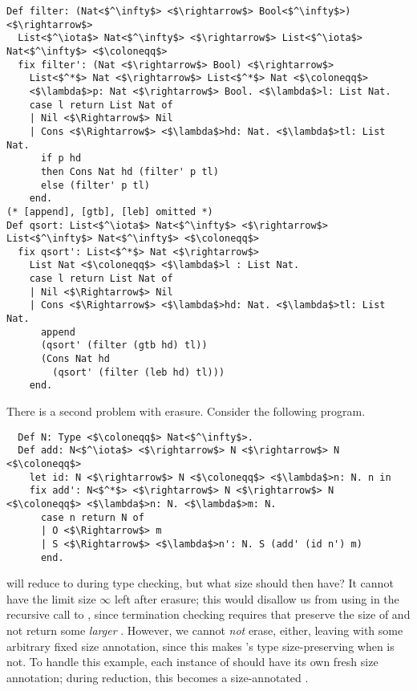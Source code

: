 \begin{multicols}{2}
\begin{verbatim}
Def filter: (Nat<$^\infty$> <$\rightarrow$> Bool<$^\infty$>) <$\rightarrow$>
  List<$^\iota$> Nat<$^\infty$> <$\rightarrow$> List<$^\iota$> Nat<$^\infty$> <$\coloneqq$>
  fix filter': (Nat <$\rightarrow$> Bool) <$\rightarrow$>
    List<$^*$> Nat <$\rightarrow$> List<$^*$> Nat <$\coloneqq$>
    <$\lambda$>p: Nat <$\rightarrow$> Bool. <$\lambda$>l: List Nat.
    case l return List Nat of
    | Nil <$\Rightarrow$> Nil
    | Cons <$\Rightarrow$> <$\lambda$>hd: Nat. <$\lambda$>tl: List Nat.
      if p hd
      then Cons Nat hd (filter' p tl)
      else (filter' p tl)
    end.
(* [append], [gtb], [leb] omitted *)
Def qsort: List<$^\iota$> Nat<$^\infty$> <$\rightarrow$> List<$^\infty$> Nat<$^\infty$> <$\coloneqq$>
  fix qsort': List<$^*$> Nat <$\rightarrow$>
    List Nat <$\coloneqq$> <$\lambda$>l : List Nat.
    case l return List Nat of
    | Nil <$\Rightarrow$> Nil
    | Cons <$\Rightarrow$> <$\lambda$>hd: Nat. <$\lambda$>tl: List Nat.
      append
      (qsort' (filter (gtb hd) tl))
      (Cons Nat hd
        (qsort' (filter (leb hd) tl)))
    end.
\end{verbatim}
\end{multicols}

There is a second problem with erasure.
Consider the following \lang program.

\begin{verbatim}
  Def N: Type <$\coloneqq$> Nat<$^\infty$>.
  Def add: N<$^\iota$> <$\rightarrow$> N <$\rightarrow$> N <$\coloneqq$>
    let id: N <$\rightarrow$> N <$\coloneqq$> <$\lambda$>n: N. n in
    fix add': N<$^*$> <$\rightarrow$> N <$\rightarrow$> N <$\coloneqq$> <$\lambda$>n: N. <$\lambda$>m: N.
      case n return N of
      | O <$\Rightarrow$> m
      | S <$\Rightarrow$> <$\lambda$>n': N. S (add' (id n') m)
      end.
\end{verbatim}

 will reduce to  during type checking, but what size should  then have?
It cannot have the limit size $\infty$ left after erasure; this would disallow us from using  in the recursive call to , since termination checking requires that  preserve the size of  and not return some \emph{larger} .
However, we cannot \textit{not} erase, either, leaving  with some arbitrary fixed size annotation, since this makes 's type size-preserving when  is not.
To handle this example, each instance of  should have its own fresh size annotation; during reduction, this becomes a size-annotated .

